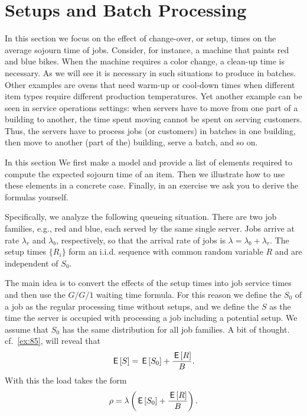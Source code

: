 \section{Setups and Batch Processing}
\label{sec:setups-batch-proc}



In this section we focus on the effect of change-over, or setup, times on the average sojourn time of jobs.
Consider, for instance, a machine that paints red and blue bikes.
When the machine requires a color change, a clean-up time is necessary.
As we will see it is necessary in such situations to produce in batches.
Other examples are ovens that need warm-up or cool-down times when different item types require different production temperatures.
Yet another example can be seen in service operations settings: when servers have to move from one part of a building to another, the time spent moving cannot be spent on serving customers.
Thus, the servers have to process jobs (or customers) in batches in one building, then move to another (part of the) building, serve a batch, and so on.

In this section We first make a model and provide a list of elements required to compute the expected sojourn time of an item.
Then we illustrate how to use these elements in a concrete case.
Finally, in an exercise we ask you to derive the formulas yourself.


Specifically, we analyze the following queueing situation.
There are two job families, e.g., red and blue, each served by the same single server.
Jobs arrive at rate $\lambda_r$ and $\lambda_b$, respectively, so that the arrival rate of jobs is $\lambda= \lambda_b+\lambda_r$.
The setup times $\{R_i\}$ form an i.i.d.
sequence with common random variable $R$ and are independent of $S_0$.

The main idea is to convert the effects of the setup times into job service times and then use the $G/G/1$ waiting time formula.
For this reason we define the  $S_0$ of a job as the regular processing time without setups, and we define the  $S$ as the time the server is occupied with processing a job including a potential setup.
We assume that $S_0$ has the same distribution for all job families.
A bit of thought. cf.~\cref{ex:85}, will reveal that 
\begin{equation}\label{eq:81}
    \,\mathsf{E}\left[S\right] = \,\mathsf{E}\left[S_0\right] + \frac{\,\mathsf{E}\left[R\right]} B.
\end{equation}
With this the load takes the form
\begin{equation*}
\rho = \lambda \left(\,\mathsf{E}\left[S_0\right] + \frac{\,\mathsf{E}\left[R\right]}B\right).
\end{equation*}

